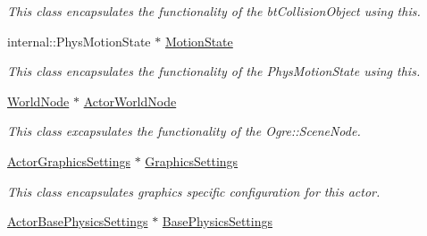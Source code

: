 \begin{DoxyCompactItemize}
\begin{DoxyCompactList}\small\item\em This class encapsulates the functionality of the btCollisionObject using this. \item\end{DoxyCompactList}\item 
\hypertarget{classphys_1_1ActorBase_ab776527aa927b8787313c50530cc24ba}{
internal::PhysMotionState $\ast$ \hyperlink{classphys_1_1ActorBase_ab776527aa927b8787313c50530cc24ba}{MotionState}}
\label{classphys_1_1ActorBase_ab776527aa927b8787313c50530cc24ba}

\begin{DoxyCompactList}\small\item\em This class encapsulates the functionality of the PhysMotionState using this. \item\end{DoxyCompactList}\item 
\hypertarget{classphys_1_1ActorBase_aca423ad9c3d92bb66a624c95b0de8b85}{
\hyperlink{classphys_1_1WorldNode}{WorldNode} $\ast$ \hyperlink{classphys_1_1ActorBase_aca423ad9c3d92bb66a624c95b0de8b85}{ActorWorldNode}}
\label{classphys_1_1ActorBase_aca423ad9c3d92bb66a624c95b0de8b85}

\begin{DoxyCompactList}\small\item\em This class excapsulates the functionality of the Ogre::SceneNode. \item\end{DoxyCompactList}\item 
\hypertarget{classphys_1_1ActorBase_acc34ec92179b9ebe392bb0ae98ce5d3a}{
\hyperlink{classphys_1_1ActorGraphicsSettings}{ActorGraphicsSettings} $\ast$ \hyperlink{classphys_1_1ActorBase_acc34ec92179b9ebe392bb0ae98ce5d3a}{GraphicsSettings}}
\label{classphys_1_1ActorBase_acc34ec92179b9ebe392bb0ae98ce5d3a}

\begin{DoxyCompactList}\small\item\em This class encapsulates graphics specific configuration for this actor. \item\end{DoxyCompactList}\item 
\hypertarget{classphys_1_1ActorBase_a07daafcbc37e64936b2eac7c9582c89f}{
\hyperlink{classphys_1_1ActorBasePhysicsSettings}{ActorBasePhysicsSettings} $\ast$ \hyperlink{classphys_1_1ActorBase_a07daafcbc37e64936b2eac7c9582c89f}{BasePhysicsSettings}}
\label{classphys_1_1ActorBase_a07daafcbc37e64936b2eac7c9582c89f}


\end{DoxyCompactItemize}
